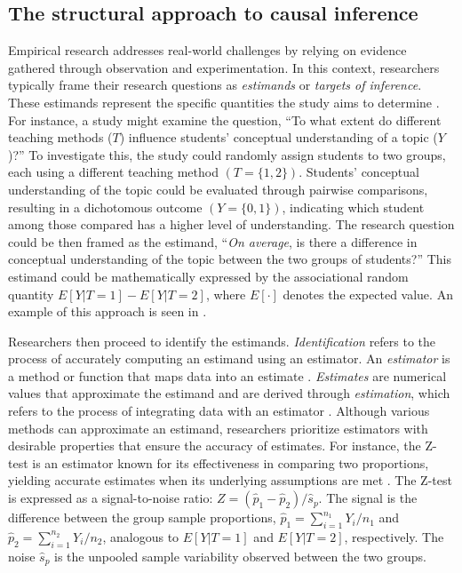 \documentclass[
  authoryear,
  preprint,
  1p]{elsarticle}
\begin{document}
\subsection{The structural approach to causal
inference}\label{sec-framework-structural}

Empirical research addresses real-world challenges by relying on
evidence gathered through observation and experimentation. In this
context, researchers typically frame their research questions as
\emph{estimands} or \emph{targets of inference}. These estimands
represent the specific quantities the study aims to determine
\citep{Everitt_et_al_2010}. For instance, a study might examine the
question, ``To what extent do different teaching methods (\(T\))
influence students' conceptual understanding of a topic (\(Y\))?'' To
investigate this, the study could randomly assign students to two
groups, each using a different teaching method \((T=\{1,2\})\).
Students' conceptual understanding of the topic could be evaluated
through pairwise comparisons, resulting in a dichotomous outcome
\((Y=\{0,1\})\), indicating which student among those compared has a
higher level of understanding. The research question could be then
framed as the estimand, ``\emph{On average}, is there a difference in
conceptual understanding of the topic between the two groups of
students?'' This estimand could be mathematically expressed by the
associational random quantity \(E[Y| T=1] - E[Y| T=2]\), where
\(E[\cdot]\) denotes the expected value. An example of this approach is
seen in \citet{Jones_et_al_2019}.

Researchers then proceed to identify the estimands.
\emph{Identification} refers to the process of accurately computing an
estimand using an estimator. An \emph{estimator} is a method or function
that maps data into an estimate \citep{Neal_2020}. \emph{Estimates} are
numerical values that approximate the estimand and are derived through
\emph{estimation}, which refers to the process of integrating data with
an estimator \citep{Everitt_et_al_2010}. Although various methods can
approximate an estimand, researchers prioritize estimators with
desirable properties that ensure the accuracy of estimates. For
instance, the Z-test is an estimator known for its effectiveness in
comparing two proportions, yielding accurate estimates when its
underlying assumptions are met \citep{Kanji_2006}. The Z-test is
expressed as a signal-to-noise ratio:
\(Z = (\hat{p}_{1} - \hat{p}_{2})/ \hat{s}_{p}\). The signal is the
difference between the group sample proportions,
\(\hat{p}_{1} = \sum_{i=1}^{n_{1}}{Y_{i}/n_{1}}\) and
\(\hat{p}_{2} = \sum_{i=1}^{n_{2}}{Y_{i}/n_{2}}\), analogous to
\(E[Y| T=1]\) and \(E[Y| T=2]\), respectively. The noise \(\hat{s}_{p}\)
is the unpooled sample variability observed between the two groups.
\end{document}
